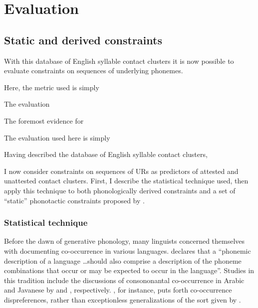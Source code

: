 
\section{Evaluation}


\subsection{Static and derived constraints}

With this database of English syllable contact clusters it is now possible to evaluate constraints on sequences of underlying phonemes. 


Here, the metric used is simply 

The evaluation 

The foremost evidence for 


The evaluation used here is simply 

Having described the database of English syllable contact clusters, 



I now consider constraints on sequences of URs as predictors of attested and unattested contact clusters. First, I describe the statistical technique used, then apply this technique to both phonologically derived constraints and a set of ``static'' phonotactic constraints proposed by \citet{Pierrehumbert1994}. 

\subsubsection{Statistical technique}
\label{stattech}

Before the dawn of generative phonology, many linguists concerned themselves with documenting co-occurrence in various languages. \citet[][28]{Vogt1954} declares that a ``phonemic description of a language \ldots should also comprise a description of the phoneme combinations that occur or may be expected to occur in the language''. Studies in this tradition include the discussions of consononantal co-occurrence in Arabic and Javanese by \citet{Greenberg1950} and \citet{Uhlenbeck1950}, respectively. \citeauthor{Uhlenbeck1950}, for instance, puts forth co-occurrence dispreferences, rather than exceptionless generalizations of the sort given by \citet{Greenberg1950}. 

